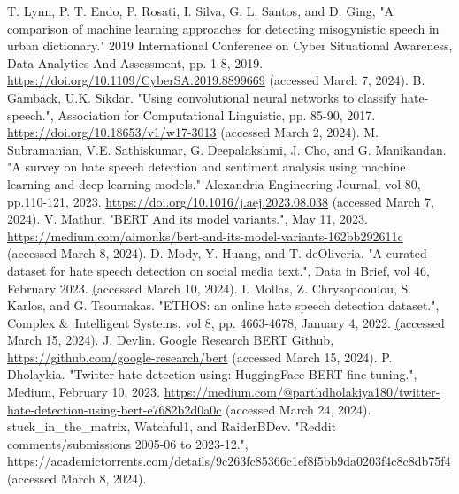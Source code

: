 \documentclass[conference]{IEEEtran}
\begin{document}
\begin{thebibliography}{00}
T. Lynn, P. T. Endo, P. Rosati, I. Silva, G. L. Santos, and D. Ging, "A comparison of machine learning approaches for detecting misogynistic speech in urban dictionary." 2019 International Conference on Cyber Situational Awareness, Data Analytics And Assessment, pp. 1-8, 2019. \href{https://doi.org/10.1109/CyberSA.2019.8899669}{https://doi.org/10.1109/CyberSA.2019.8899669} (accessed March 7, 2024).
B. Gambäck, U.K. Sikdar. "Using convolutional neural networks to classify hate-speech.", Association for Computational Linguistic, pp. 85-90, 2017. \href{https://doi.org/10.18653/v1/w17-3013} 
{https://doi.org/10.18653/v1/w17-3013} (accessed March 2, 2024).
M. Subramanian, V.E. Sathiskumar, G. Deepalakshmi, J. Cho, and G. Manikandan. "A survey on hate speech detection and sentiment analysis using machine learning and deep learning models." Alexandria Engineering Journal, vol 80, pp.110-121, 2023. \href{https://doi.org/10.1016/j.aej.2023.08.038}{https://doi.org/10.1016/j.aej.2023.08.038} (accessed March 7, 2024).
 V. Mathur. "BERT And its model variants.", May 11, 2023. \href{https://medium.com/aimonks/bert-and-its-model-variants-162bb292611c}{https://medium.com/aimonks/bert-and-its-model-variants-162bb292611c} (accessed March 8, 2024).
 D. Mody, Y. Huang, and T. deOliveria. "A curated dataset for hate speech detection on social media text.", Data in Brief, vol 46, February 2023. \href{https://www.sciencedirect.com/science/article/pii/S2352340922010356?via%3Dihub} (accessed March 10, 2024).
 I. Mollas, Z. Chrysopooulou, S. Karlos, and G. Tsoumakas. "ETHOS: an online hate speech detection dataset.", Complex \&\ Intelligent Systems, vol 8, pp. 4663-4678, January 4, 2022. \href{https://arxiv.org/pdf/2006.08328.pdf} (accessed March 15, 2024).
J. Devlin. Google Research BERT Github, \href{https://github.com/google-research/bert}{https://github.com/google-research/bert} (accessed March 15, 2024).
 P. Dholaykia. "Twitter hate detection using: HuggingFace BERT fine-tuning.", Medium, February 10, 2023. \href{https://medium.com/@parthdholakiya180/twitter-hate-detection-using-bert-e7682b2d0a0c}{https://medium.com/@parthdholakiya180/twitter-hate-detection-using-bert-e7682b2d0a0c} (accessed March 24, 2024).
 stuck_in_the_matrix, Watchful1, and RaiderBDev. "Reddit comments/submissions 2005-06 to 2023-12.", \href{https://academictorrents.com/details/9c263fc85366c1ef8f5bb9da0203f4c8c8db75f4}{https://academictorrents.com/details/9c263fc85366c1ef8f5bb9da0203f4c8c8db75f4} (accessed March 8, 2024).

\end{thebibliography}
\end{document}
